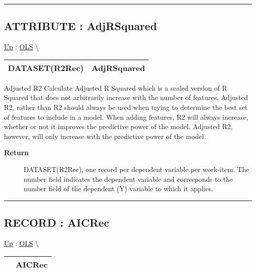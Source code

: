 \rule{\linewidth}{0.5pt}
\subsection*{ATTRIBUTE : AdjRSquared}
\hypertarget{ecldoc:linearregression.ols.adjrsquared}{}
\hyperlink{ecldoc:linearregression.ols}{Up} :
\hspace{0pt} \hyperlink{ecldoc:linearregression.ols}{OLS} \textbackslash 

{\renewcommand{\arraystretch}{1.5}
\begin{tabularx}{\textwidth}{|>{\raggedright\arraybackslash}l|X|}
\hline
\hspace{0pt}DATASET(R2Rec) & AdjRSquared \\
\hline
\end{tabularx}
}

\par
Adjusted R2 Calculate Adjusted R Squared which is a scaled version of R Squared that does not arbitrarily increase with the number of features. Adjusted R2, rather than R2 should always be used when trying to determine the best set of features to include in a model. When adding features, R2 will always increase, whether or not it improves the predictive power of the model. Adjusted R2, however, will only increase with the predictive power of the model.

\par
\begin{description}
\item [\textbf{Return}] DATASET(R2Rec), one record per dependent variable per work-item. The number field indicates the dependent variable and corresponds to the number field of the dependent (Y) variable to which it applies.
\end{description}

\rule{\linewidth}{0.5pt}
\subsection*{RECORD : AICRec}
\hypertarget{ecldoc:linearregression.ols.aicrec}{}
\hyperlink{ecldoc:linearregression.ols}{Up} :
\hspace{0pt} \hyperlink{ecldoc:linearregression.ols}{OLS} \textbackslash 

{\renewcommand{\arraystretch}{1.5}
\begin{tabularx}{\textwidth}{|>{\raggedright\arraybackslash}l|X|}
\hline
\hspace{0pt} & AICRec \\
\hline
\end{tabularx}
}

